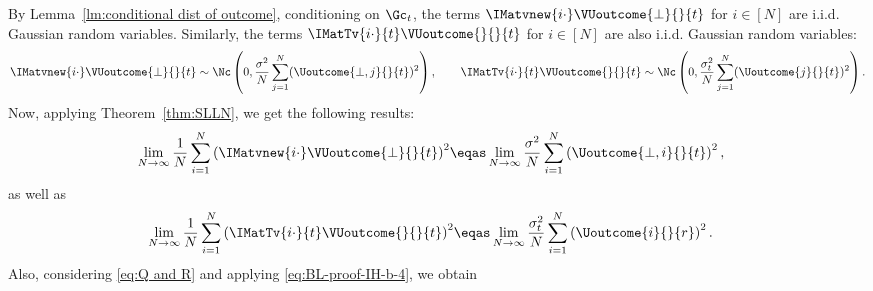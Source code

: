 \begin{enumerate}[label=(\alph*)]
        By Lemma~\ref{lm:conditional dist of outcome}, conditioning on $\Gc_t$, the terms $\IMatvnew{i\cdot} \VUoutcome{\perp}{}{t}$ for $i \in [N]$ are i.i.d. Gaussian random variables. Similarly, the terms $\IMatTv{i \cdot}{t} \VUoutcome{}{}{t}$ for $i \in [N]$ are also i.i.d. Gaussian random variables:
        \begin{equation}
            \label{eq:BL-proof-bt-simple-1}
            \begin{aligned}
                \IMatvnew{i\cdot} \VUoutcome{\perp}{}{t} \sim \Nc\left(0, \frac{\sigma^2}{N} \sum_{j=1}^N (\Uoutcome{\perp,j}{}{t})^2\right),
            \quad\quad
                \IMatTv{i \cdot}{t} \VUoutcome{}{}{t} \sim \Nc\left(0, \frac{\sigma_t^2}{N} \sum_{j=1}^N (\Uoutcome{j}{}{t})^2\right).
            \end{aligned}
        \end{equation}
        Now, applying Theorem~\ref{thm:SLLN}, we get the following results:
        \begin{equation}
            \label{eq:BL-proof-bt-simple-4}
            \begin{aligned}
                \lim_{N \rightarrow \infty}
                \frac{1}{N}
                \sum_{i=1}^N
                \left(
                \IMatvnew{i\cdot} 
                \VUoutcome{\perp}{}{t}
                \right)^2
                &\eqas
                \lim_{N \rightarrow \infty} \frac{\sigma^2}{N}
                \sum_{i=1}^N
                \left(\Uoutcome{\perp,i}{}{t}\right)^2,
            \end{aligned}
        \end{equation}
        as well as
        \begin{equation}
            \label{eq:BL-proof-bt-simple-5}
            \begin{aligned}
                \lim_{N \rightarrow \infty}
                \frac{1}{N}
                \sum_{i=1}^N
                \left(
                \IMatTv{i \cdot}{t}
                \VUoutcome{}{}{t}
                \right)^2
                &\eqas
                \lim_{N \rightarrow \infty} \frac{\sigma_t^2}{N}
                \sum_{i=1}^N
                \left(\Uoutcome{i}{}{r}\right)^2.
            \end{aligned}
        \end{equation}
        Also, considering \eqref{eq:Q and R} and applying \eqref{eq:BL-proof-IH-b-4}, we obtain
        \begin{equation}

\end{equation}
\end{enumerate}
